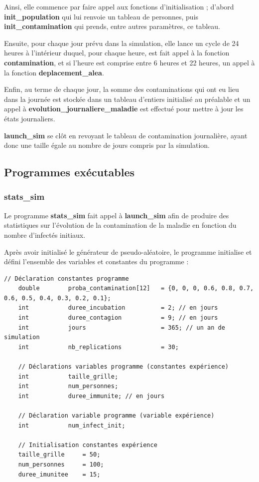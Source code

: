 \documentclass[12pt,french,titlepage]{article}
\begin{document}
Ainsi, elle commence par faire appel aux fonctions d'initialisation ; d'abord \textbf{init\_population} qui lui renvoie un tableau de personnes, puis \textbf{init\_contamination} qui prends, entre autres paramètres, ce tableau.

Ensuite, pour chaque jour prévu dans la simulation, elle lance un cycle de 24 heures à l'intérieur duquel, pour chaque heure, est fait appel à la fonction \textbf{contamination}, et si l'heure est comprise entre 6 heures et 22 heures, un appel à la fonction \textbf{deplacement\_alea}.

Enfin, au terme de chaque jour, la somme des contaminations qui ont eu lieu dans la journée est stockée dans un tableau d'entiers initialisé au préalable et un appel à  \textbf{evolution\_journaliere\_maladie} est effectué pour mettre à jour les états journaliers.

\textbf{launch\_sim} se clôt en revoyant le tableau de contamination journalière, ayant donc une taille égale au nombre de jours compris par la simulation.

\newpage

\subsection{Programmes exécutables}
\subsubsection{stats\_sim}
\label{sec:stats_sim}
Le programme \textbf{stats\_sim} fait appel à \textbf{launch\_sim} afin de produire des statistiques sur l'évolution de la contamination de la maladie en fonction du nombre d'infectés initiaux.

Après avoir initialisé le générateur de pseudo-aléatoire, le programme initialise et défini l'ensemble des variables et constantes du programme :
\begin{lstlisting}
// Déclaration constantes programme
    double        proba_contamination[12]   = {0, 0, 0, 0.6, 0.8, 0.7, 0.6, 0.5, 0.4, 0.3, 0.2, 0.1};
    int           duree_incubation          = 2; // en jours
    int           duree_contagion           = 9; // en jours
    int           jours                     = 365; // un an de simulation
    int           nb_replications           = 30;

    // Déclarations variables programme (constantes expérience)
    int           taille_grille;
    int           num_personnes;
    int           duree_immunite; // en jours

    // Déclaration variable programme (variable expérience)
    int           num_infect_init;
    
    // Initialisation constantes expérience
    taille_grille     = 50;
    num_personnes     = 100;
    duree_imunitee    = 15;
\end{lstlisting}
\end{document}
